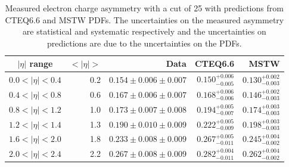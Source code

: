 \begin{table}[htbp]
\begin{center}
\begin{tabular}{crrrr}
    \toprule
$|\eta|$ range & $<|\eta|>$ & Data & CTEQ6.6 & MSTW \\
\midrule 
$0.0<|\eta|<0.4$ & 0.2 & $0.154\pm0.006\pm0.007$ & $0.150^{+0.006}_{-0.005}$ & $0.130^{+0.002}_{-0.003}$\\
$0.4<|\eta|<0.8$ & 0.6 & $0.167\pm0.006\pm0.007$ & $0.168^{+0.006}_{-0.006}$ & $0.146^{+0.002}_{-0.003}$\\
$0.8<|\eta|<1.2$ & 1.0 & $0.173\pm0.007\pm0.008$ & $0.194^{+0.005}_{-0.007}$ & $0.174^{+0.003}_{-0.003}$\\
$1.2<|\eta|<1.4$ & 1.3 & $0.190\pm0.010\pm0.009$ & $0.222^{+0.005}_{-0.009}$ & $0.198^{+0.003}_{-0.003}$\\
$1.6<|\eta|<2.0$ & 1.8 & $0.233\pm0.008\pm0.009$ & $0.267^{+0.005}_{-0.011}$ & $0.245^{+0.004}_{-0.002}$\\
$2.0<|\eta|<2.4$ & 2.2 & $0.267\pm0.008\pm0.009$ & $0.282^{+0.004}_{-0.011}$ & $0.262^{+0.004}_{-0.002}$\\
    \bottomrule
\end{tabular}
\caption[Measured electron charge asymmetry with a \pT cut of \unit{25}{\GeV}]
{Measured electron charge asymmetry with a \pT cut of \unit{25}{\GeV} with
predictions from CTEQ6.6 and MSTW PDFs.  The uncertainties on the measured
asymmetry are statistical and systematic respectively and the uncertainties on
predictions are due to the uncertainties on the PDFs\cite{baisini2010electron}.}
\label{tab:results25}
\end{center}
\end{table}


